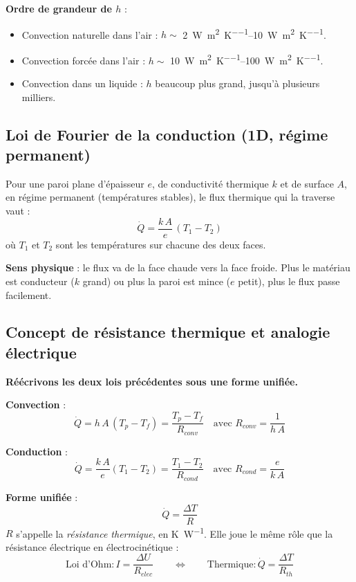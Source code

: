 \documentclass[11pt,a4paper]{article}
\begin{document}
\textbf{Ordre de grandeur de $h$} :
\begin{itemize}[itemsep=0pt]
\item Convection naturelle dans l'air : $h \sim$ \SIrange{2}{10}{\watt\per\meter\squared\per\kelvin}.
\item Convection forcée dans l'air : $h \sim$ \SIrange{10}{100}{\watt\per\meter\squared\per\kelvin}.
\item Convection dans un liquide : $h$ beaucoup plus grand, jusqu'à plusieurs milliers.
\end{itemize}

\subsection{Loi de Fourier de la conduction (1D, régime permanent)}

\begin{principe}
Pour une paroi plane d'épaisseur $e$, de conductivité thermique $k$ et de surface $A$, en
régime permanent (températures stables), le flux thermique qui la traverse vaut :
\begin{equation}
\dot Q = \frac{k\,A}{e}\,(T_1 - T_2)
\end{equation}
où $T_1$ et $T_2$ sont les températures sur chacune des deux faces.
\end{principe}

\textbf{Sens physique} : le flux va de la face chaude vers la face froide. Plus le matériau
est conducteur ($k$ grand) ou plus la paroi est mince ($e$ petit), plus le flux passe
facilement.

\subsection{Concept de résistance thermique et analogie électrique}

\begin{demo}
\textbf{Réécrivons les deux lois précédentes sous une forme unifiée.}

\medskip
\textbf{Convection} :
$$\dot Q = h\,A\,(T_p - T_f) = \frac{T_p - T_f}{R_{conv}} \quad \text{avec } R_{conv} = \frac{1}{h\,A}$$

\medskip
\textbf{Conduction} :
$$\dot Q = \frac{k\,A}{e}(T_1 - T_2) = \frac{T_1 - T_2}{R_{cond}} \quad \text{avec } R_{cond} = \frac{e}{k\,A}$$

\medskip
\textbf{Forme unifiée} :
\begin{equation}
\boxed{\;\dot Q = \frac{\Delta T}{R}\;}
\label{eq:forme_unifiee}
\end{equation}
$R$ s'appelle la \emph{résistance thermique}, en \si{\kelvin\per\watt}. Elle joue le même rôle
que la résistance électrique en électrocinétique :
$$\text{Loi d'Ohm} : I = \frac{\Delta U}{R_{elec}} \qquad \Longleftrightarrow \qquad
\text{Thermique} : \dot Q = \frac{\Delta T}{R_{th}}$$
\end{demo}
\end{document}
